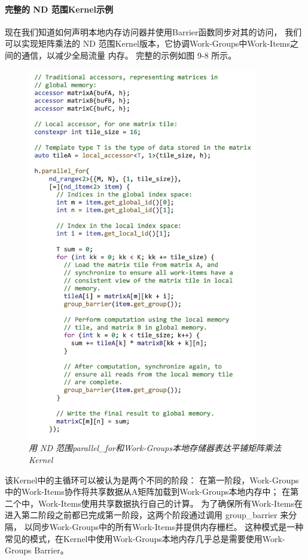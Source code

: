 \paragraph{完整的 ND 范围Kernel示例}

现在我们知道如何声明本地内存访问器并使用Barrier函数同步对其的访问，
我们可以实现矩阵乘法的 ND 范围Kernel版本，它协调Work-Groups中Work-Items之间的通信，以减少全局流量 内存。 
完整的示例如图 9-8 所示。

\begin{figure}[H]
	\centering
	\includegraphics[width=0.9\textwidth]{figs/F9.8.png}
	\caption{\textit{用 ND 范围parallel\_for和Work-Groups本地存储器表达平铺矩阵乘法Kernel }}
\end{figure}

该Kernel中的主循环可以被认为是两个不同的阶段：
在第一阶段，Work-Groups中的Work-Items协作将共享数据从A矩阵加载到Work-Groups本地内存中； 
在第二个中，Work-Items使用共享数据执行自己的计算。 
为了确保所有Work-Items在进入第二阶段之前都已完成第一阶段，这两个阶段通过调用 group\_barrier 来分隔，
以同步Work-Groups中的所有Work-Items并提供内存栅栏。 
这种模式是一种常见的模式，在Kernel中使用Work-Groups本地内存几乎总是需要使用Work-Groups Barrier。

